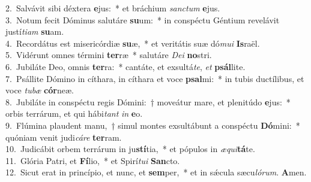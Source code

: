 {2.~}Salvávit sibi déxtera \textbf{e}jus:~* et bráchium \textit{san}\textit{ctum} \textbf{e}jus.\\
{3.~}Notum fecit Dóminus salutáre \textbf{su}um:~* in conspéctu Géntium revelávit justí\textit{ti}\textit{am} \textbf{su}am.\\
{4.~}Recordátus est misericórdiæ \textbf{su}æ,~* et veritátis suæ dó\textit{mu}\textit{i} \textbf{Is}raël.\\
{5.~}Vidérunt omnes términi \textbf{ter}ræ~* salutáre \textit{De}\textit{i} \textbf{no}stri.\\
{6.~}Jubiláte Deo, omnis \textbf{ter}ra:~* cantáte, et exsultá\textit{te}, \textit{et} \textbf{psál}lite.\\
{7.~}Psállite Dómino in cíthara, in cíthara et voce \textbf{psal}mi:~* in tubis ductílibus, et voce \textit{tu}\textit{bæ} \textbf{cór}neæ.\\
{8.~}Jubiláte in conspéctu regis Dómini:~† moveátur mare, et plenitúdo \textbf{e}jus:~* orbis terrárum, et qui hábi\textit{tant} \textit{in} \textbf{e}o.\\
{9.~}Flúmina plaudent manu,~† simul montes exsultábunt a conspéctu \textbf{Dó}mini:~* quóniam venit judi\textit{cá}\textit{re} \textbf{ter}ram.\\
{10.~}Judicábit orbem terrárum in ju\textbf{stí}tia,~* et pópulos in \textit{æ}\textit{qui}\textbf{tá}te.\\
{11.~}Glória Patri, et \textbf{Fí}lio,~* et Spirí\textit{tu}\textit{i} \textbf{San}cto.\\
{12.~}Sicut erat in princípio, et nunc, et \textbf{sem}per,~* et in sǽcula sæcu\textit{ló}\textit{rum}. \textbf{A}men.\\
